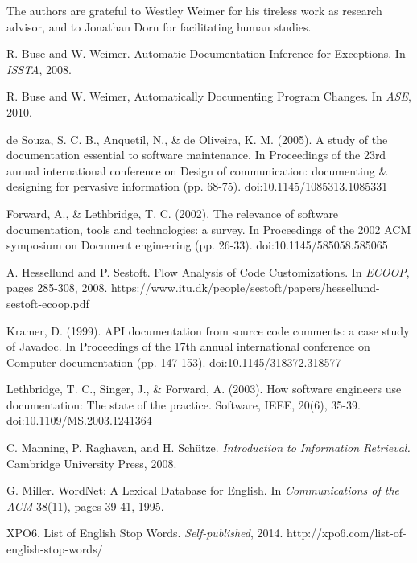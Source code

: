 \documentclass[preprint]{sigplanconf}
\begin{document}
The authors are grateful to Westley Weimer for his tireless work as research advisor, and to Jonathan Dorn for facilitating human studies.





\begin{thebibliography}{}
\softraggedright

R. Buse and W. Weimer. Automatic Documentation Inference for Exceptions. In \emph{ISSTA}, 2008.

R. Buse and W. Weimer, Automatically Documenting Program Changes. In \emph{ASE}, 2010.

de Souza, S. C. B., Anquetil, N., \& de Oliveira, K. M. (2005). A study of the documentation essential to software maintenance. In Proceedings of the 23rd annual international conference on Design of communication: documenting \& designing for pervasive information (pp. 68-75). doi:10.1145/1085313.1085331

Forward, A., \& Lethbridge, T. C. (2002). The relevance of software documentation, tools and technologies: a survey. In Proceedings of the 2002 ACM symposium on Document engineering (pp. 26-33). doi:10.1145/585058.585065

A. Hessellund and P. Sestoft. Flow Analysis of Code Customizations. In \emph{ECOOP}, pages 285-308, 2008.
https://www.itu.dk/people/sestoft/papers/hessellund-sestoft-ecoop.pdf

Kramer, D. (1999). API documentation from source code comments: a case study of Javadoc. In Proceedings of the 17th annual international conference on Computer documentation (pp. 147-153). doi:10.1145/318372.318577

Lethbridge, T. C., Singer, J., \& Forward, A. (2003). How software engineers use documentation: The state of the practice. Software, IEEE, 20(6), 35-39. doi:10.1109/MS.2003.1241364

C. Manning, P. Raghavan, and H. Schütze. \emph{Introduction to Information Retrieval.} Cambridge University Press, 2008.

G. Miller. WordNet: A Lexical Database for English. In \emph{Communications of the ACM} 38(11), pages 39-41, 1995.

XPO6. List of English Stop Words. \emph{Self-published}, 2014.
http://xpo6.com/list-of-english-stop-words/

\end{thebibliography}
\end{document}
